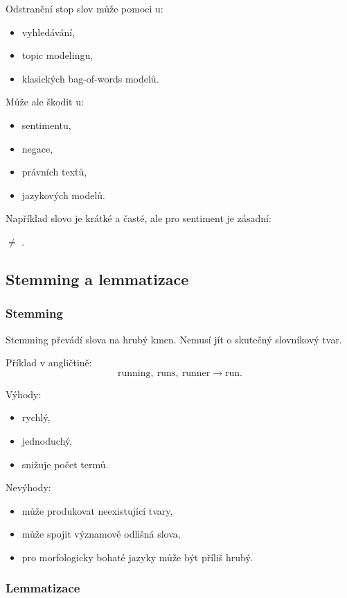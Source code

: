 Odstranění stop slov může pomoci u:
\begin{itemize}
    \item vyhledávání,
    \item topic modelingu,
    \item klasických bag-of-words modelů.
\end{itemize}

Může ale škodit u:
\begin{itemize}
    \item sentimentu,
    \item negace,
    \item právních textů,
    \item jazykových modelů.
\end{itemize}

Například slovo  je krátké a časté, ale pro sentiment je zásadní:
\begin{center}
 $\neq$ .
\end{center}

\subsection{Stemming a lemmatizace}

\subsubsection{Stemming}

Stemming převádí slova na hrubý kmen. Nemusí jít o skutečný slovníkový tvar.

Příklad v angličtině:
\[
\text{running},\ \text{runs},\ \text{runner}
\rightarrow
\text{run}.
\]

Výhody:
\begin{itemize}
    \item rychlý,
    \item jednoduchý,
    \item snižuje počet termů.
\end{itemize}

Nevýhody:
\begin{itemize}
    \item může produkovat neexistující tvary,
    \item může spojit významově odlišná slova,
    \item pro morfologicky bohaté jazyky může být příliš hrubý.
\end{itemize}

\subsubsection{Lemmatizace}

